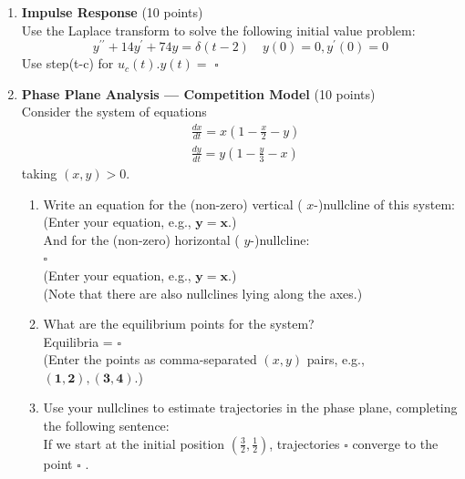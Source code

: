 \begin{enumerate}
  \item \textbf{Impulse Response} (10 points)\\
  Use the Laplace transform to solve the following initial value problem:
  $$
  y^{\prime \prime}+14 y^{\prime}+74 y=\delta(t-2) \quad y(0)=0, y^{\prime}(0)=0
  $$
  Use step(t-c) for $u_c(t) . y(t)=$ $\square$\\
  \begin{subanswer}
  \end{subanswer}

  \newpage

  \item \textbf{Phase Plane Analysis --- Competition Model} (10 points)\\
  Consider the system of equations
  $$
  \begin{aligned}
  & \frac{d x}{d t}=x\left(1-\frac{x}{2}-y\right) \\
  & \frac{d y}{d t}=y\left(1-\frac{y}{3}-x\right)
  \end{aligned}
  $$
  taking $(x, y)>0$.
  \begin{enumerate}[label=(\alph*)]
    \item Write an equation for the (non-zero) vertical ( $x$-)nullcline of this system:\\
    (Enter your equation, e.g., $\boldsymbol{y}=\boldsymbol{x}$.)\\
    And for the (non-zero) horizontal ( $y$-)nullcline:\\
    $\square$\\
    (Enter your equation, e.g., $\boldsymbol{y}=\boldsymbol{x}$.)\\
    (Note that there are also nullclines lying along the axes.)\\
    \begin{subanswer}
    \end{subanswer}
    \item What are the equilibrium points for the system?\\
    Equilibria = $\square$\\
    (Enter the points as comma-separated $(x, y)$ pairs, e.g., $(\mathbf{1 , 2}),(\mathbf{3 , 4})$.)\\
    \begin{subanswer}
    \end{subanswer}
    \item Use your nullclines to estimate trajectories in the phase plane, completing the following sentence:\\
    If we start at the initial position $\left(\frac{3}{2}, \frac{1}{2}\right)$, trajectories $\square$ converge to the point $\square$ .\\
    \begin{subanswer}
    \end{subanswer}
  \end{enumerate}


\end{enumerate}
